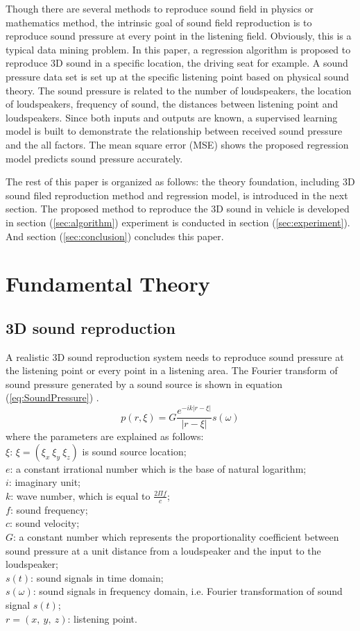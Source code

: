 \documentclass[runningheads,a4paper]{llncs}
\begin{document}
Though there are several methods to reproduce sound field in physics or mathematics method, the intrinsic goal of sound field reproduction is to reproduce sound pressure at every point in the listening field. Obviously, this is a typical data mining problem. In this paper, a regression algorithm is proposed to reproduce 3D sound in a specific location, the driving seat for example. A sound pressure data set is set up at the specific listening point based on physical sound theory. The sound pressure is related to the number of loudspeakers, the location of loudspeakers, frequency of sound, the distances between listening point and loudspeakers. Since both inputs and outputs are known, a supervised learning model is built to demonstrate the relationship between received sound pressure and the all factors. The mean square error (MSE) shows the proposed regression model predicts sound pressure accurately.

The rest of this paper is organized as follows: the theory foundation, including 3D sound filed reproduction method and regression model, is introduced in the next section. The proposed method to reproduce the 3D sound in vehicle is developed in section (\ref{sec:algorithm}) experiment is conducted in section (\ref{sec:experiment}). And section (\ref{sec:conclusion}) concludes this paper.


\section{Fundamental Theory}\label{sec:Fundamental}
\subsection{3D sound reproduction}
A realistic 3D sound reproduction system needs to reproduce sound pressure at the listening point or every point in a listening area. The Fourier transform of sound pressure generated by a sound source is shown in equation (\ref{eq:SoundPressure}) \cite{zms2015}\cite{Ando11TASLP}\cite{WS13ICME}.
\begin{equation}\label{eq:SoundPressure}
p(r,\xi)=G\frac{e^{-ik|r-\xi|}}{|r-\xi|}s(\omega)
\end{equation}
where the parameters are explained as follows:\\
$\xi$: $\xi=(\xi_x\ \xi_y\ \xi_z)$ is sound source location;\\
$e$: a constant irrational number which is the base of natural logarithm;\\
$i$: imaginary unit;\\
$k$: wave number, which is equal to $\frac{2{\Pi}f}{c}$;\\
$f$: sound frequency; \\
$c$: sound velocity;\\
$G$: a constant number which represents the proportionality coefficient between sound pressure at a unit distance from a loudspeaker and the input to the loudspeaker;\\
$s(t)$: sound signals in time domain; \\
$s(\omega)$: sound signals in frequency domain, i.e. Fourier transformation of sound signal $s(t)$;\\
$r=(x,\ y,\ z)$: listening point.
\end{document}
